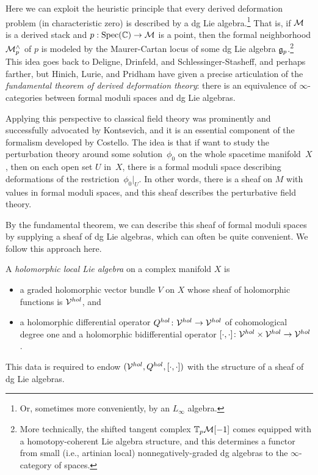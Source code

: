 \documentclass[11pt]{amsart}
\def\Spec{\text{Spec}}
\begin{document}
Here we can exploit the heuristic principle that every derived deformation problem (in characteristic zero) is described by a dg Lie algebra.\footnote{Or, sometimes more conveniently, by an $L_\infty$ algebra.}
That is, if $\mathcal M$ is a derived stack and $p: \Spec(\CC) \to \cM$ is a point, 
then the formal neighborhood $\mathcal M^\wedge_p$ of $p$ is modeled by the Maurer-Cartan locus of some dg Lie algebra $\mathfrak g_p$.\footnote{More technically, the shifted tangent complex $\mathbb T_p \mathcal M[-1]$ comes equipped with a homotopy-coherent Lie algebra structure, 
and this determines a functor from small (i.e., artinian local) nonnegatively-graded dg algebras to the $\infty$-category of spaces.}
This idea goes back to Deligne, Drinfeld, and Schlessinger-Stasheff, and perhaps farther, 
but Hinich, Lurie, and Pridham have given a precise articulation of the {\em fundamental theorem of derived deformation theory}:
there is an equivalence of $\infty$-categories between formal moduli spaces and dg Lie algebras.

Applying this perspective to classical field theory was prominently and successfully advocated by Kontsevich, 
and it is an essential component of the formalism developed by Costello.
The idea is that if want to study the perturbation theory around some solution~$\phi_0$ on the whole spacetime manifold~$X$,
then on each open set $U$ in~$X$,
there is a formal moduli space describing deformations of the restriction~$\phi_0|_U$.
In other words, there is a sheaf on $M$ with values in formal moduli spaces,
and this sheaf describes the perturbative field theory.

By the fundamental theorem, we can describe this sheaf of formal moduli spaces by supplying a sheaf of dg Lie algebras, which can often be quite convenient.
We follow this approach here.

\begin{dfn} 
A {\em holomorphic local Lie algebra} on a complex manifold $X$ is
\begin{itemize}
\item a graded holomorphic vector bundle $V$ on $X$ whose sheaf of holomorphic functions is $\mathcal V^{hol}$, and
\item a holomorphic differential operator $Q^{hol} \colon \mathcal V^{hol} \to \mathcal V^{hol}$ of cohomological degree one and a holomorphic bidifferential operator $[\cdot,\cdot] \colon \mathcal V^{hol} \times \mathcal V^{hol} \to \mathcal V^{hol}$. 
\end{itemize}
This data is required to endow $(\mathcal V^{hol}, Q^{hol}, [\cdot,\cdot])$ with the structure of a sheaf of dg Lie algebras.
\end{dfn}
\end{document}

